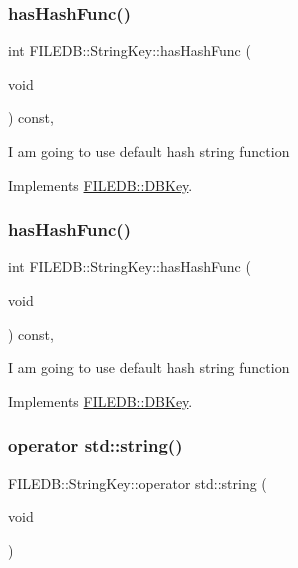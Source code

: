 \subsubsection{\texorpdfstring{hasHashFunc()}{hasHashFunc()}\hspace{0.1cm}{\footnotesize\ttfamily [1/2]}}
{\footnotesize\ttfamily int F\+I\+L\+E\+D\+B\+::\+String\+Key\+::has\+Hash\+Func (\begin{DoxyParamCaption}\item[{void}]{ }\end{DoxyParamCaption}) const\hspace{0.3cm}{\ttfamily [inline]}, {\ttfamily [virtual]}}

I am going to use default hash string function 

Implements \mbox{\hyperlink{classFILEDB_1_1DBKey_a541dab4f4083ae951dee2f30483eb18e}{F\+I\+L\+E\+D\+B\+::\+D\+B\+Key}}.

\mbox{\label{classFILEDB_1_1StringKey_afb2fa99d53c0f4b5aeca0377228ea722}} 
\subsubsection{\texorpdfstring{hasHashFunc()}{hasHashFunc()}\hspace{0.1cm}{\footnotesize\ttfamily [2/2]}}
{\footnotesize\ttfamily int F\+I\+L\+E\+D\+B\+::\+String\+Key\+::has\+Hash\+Func (\begin{DoxyParamCaption}\item[{void}]{ }\end{DoxyParamCaption}) const\hspace{0.3cm}{\ttfamily [inline]}, {\ttfamily [virtual]}}

I am going to use default hash string function 

Implements \mbox{\hyperlink{classFILEDB_1_1DBKey_a541dab4f4083ae951dee2f30483eb18e}{F\+I\+L\+E\+D\+B\+::\+D\+B\+Key}}.

\mbox{\label{classFILEDB_1_1StringKey_a4ce28a2e70cc35cbf7dd8f7a9424fbb0}} 
\subsubsection{\texorpdfstring{operator std::string()}{operator std::string()}\hspace{0.1cm}{\footnotesize\ttfamily [1/2]}}
{\footnotesize\ttfamily F\+I\+L\+E\+D\+B\+::\+String\+Key\+::operator std\+::string (\begin{DoxyParamCaption}\item[{void}]{ }\end{DoxyParamCaption})}

